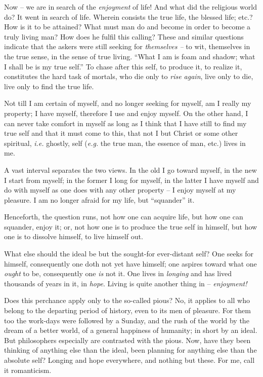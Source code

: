 \documentclass[12pt,a4paper]{book}
\begin{document}
Now -- we are in search of the \textit{enjoyment} of life! And what did the 
religious world do? It went in search of life. Wherein consists the true life, 
the blessed life; etc.? How is it to be attained? What must man do and become 
in order to become a truly living man? How does he fulfil this calling? These 
and similar questions indicate that the askers were still seeking for 
\textit{themselves --} to wit, themselves in the true sense, in the sense of 
true living. ``What I am is foam and shadow; what I shall be is my true 
self.'' To chase after this self, to produce it, to realize it, constitutes 
the hard task of mortals, who die only to \textit{rise again}, live only to 
die, live only to find the true life.

Not till I am certain of myself, and no longer seeking for myself, am I really 
my property; I have myself, therefore I use and enjoy myself. On the other 
hand, I can never take comfort in myself as long as I think that I have still 
to find my true self and that it must come to this, that not I but Christ or 
some other spiritual, \textit{i.e.} ghostly, self (\textit{e.g.} the true 
man, the essence of man, etc.) lives in me.

A vast interval separates the two views. In the old I go toward myself, in the 
new I start from myself; in the former I long for myself, in the latter I have 
myself and do with myself as one does with any other property -- I enjoy 
myself at my pleasure. I am no longer afraid for my life, but ``squander'' 
it.

Henceforth, the question runs, not how one can acquire life, but how one can 
squander, enjoy it; or, not how one is to produce the true self in himself, 
but how one is to dissolve himself, to live himself out.

What else should the ideal be but the sought-for ever-distant self? One seeks 
for himself, consequently one doth not yet have himself; one aspires toward 
what one \textit{ought} to be, consequently one \textit{is} not it. One lives 
in \textit{longing} and has lived thousands of years in it, in \textit{hope}. 
Living is quite another thing in -- \textit{enjoyment!}

Does this perchance apply only to the so-called pious? No, it applies to all 
who belong to the departing period of history, even to its men of pleasure. 
For them too the work-days were followed by a Sunday, and the rush of the 
world by the dream of a better world, of a general happiness of humanity; in 
short by an ideal. But philosophers especially are contrasted with the pious. 
Now, have they been thinking of anything else than the ideal, been planning 
for anything else than the absolute self? Longing and hope everywhere, and 
nothing but these. For me, call it romanticism.
\end{document}
